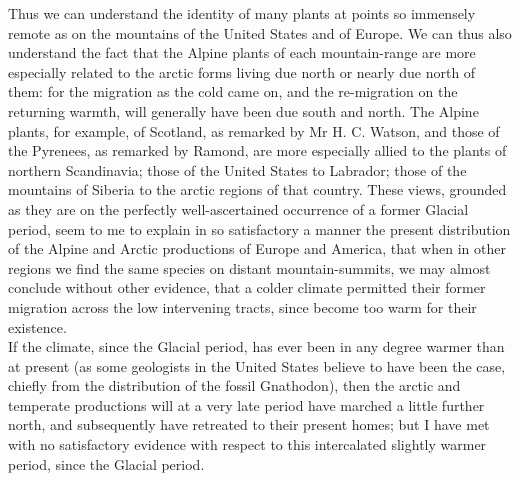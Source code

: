 \indent Thus we can understand the identity of many plants at points so immensely remote as on the mountains of the United States and of Europe. We can thus also understand the fact that the Alpine plants of each mountain-range are more especially related to the arctic forms living due north or nearly due north of them: for the migration as the cold came on, and the re-migration on the returning warmth, will generally have been due south and north. The Alpine plants, for example, of Scotland, as remarked by Mr H. C. Watson, and those of the Pyrenees, as remarked by Ramond, are more especially allied to the plants of northern Scandinavia; those of the United States to Labrador; those of the mountains of Siberia to the arctic regions of that country.  These views, grounded as they are on the perfectly well-ascertained occurrence of a former Glacial period, seem to me to explain in so satisfactory a manner the present distribution of the Alpine and Arctic productions of Europe and America, that when in other regions we find the same species on distant mountain-summits, we may almost conclude without other evidence, that a colder climate permitted their former migration across the low intervening tracts, since become too warm for their existence.~\\
\indent If the climate, since the Glacial period, has ever been in any degree warmer than at present (as some geologists in the United States believe to have been the case, chiefly from the distribution of the fossil Gnathodon), then the arctic and temperate productions will at a very late period have marched a little further north, and subsequently have retreated to their present homes; but I have met with no satisfactory evidence with respect to this intercalated slightly warmer period, since the Glacial period.~\\

